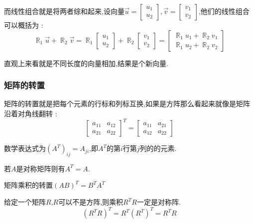 \documentclass[UTF8,12pt]{ctexbook}
\newcommand{\transpose}{^T}
\DeclareMathOperator{\mathRealNumberCollection}{\mathbb{R}}
\begin{document}
{{{{{    而线性组合就是将两者综和起来,设向量$\vec{u} = \begin{bmatrix}
        u_1 \\
        u_2
      \end{bmatrix},\vec{v} = \begin{bmatrix}
        v_1 \\
        v_2
      \end{bmatrix}$,他们的线性组合可以概括为 : $$
      \mathRealNumberCollection_1\vec{u} + \mathRealNumberCollection_2\vec{v} = \mathRealNumberCollection_1\begin{bmatrix}
        u_1 \\
        u_2
      \end{bmatrix}
      +
      \mathRealNumberCollection_2\begin{bmatrix}
        v_1 \\
        v_2
      \end{bmatrix}
      =
      \begin{bmatrix}
        \mathRealNumberCollection_1 u_1 + \mathRealNumberCollection_2 v_1 \\
        \mathRealNumberCollection_1 u_2 + \mathRealNumberCollection_2 v_2
      \end{bmatrix}
    $$

    直观上来看就是不同长度的向量相加,结果是个新向量.
  }%

  \subsubsection{矩阵的转置}{
    矩阵的转置就是把每个元素的行标和列标互换,如果是方阵那么看起来就像是矩阵沿着对角线翻转 :
    $$
      \begin{bmatrix}
        a_{11} & a_{12} \\
        a_{21} & a_{22}
      \end{bmatrix}\transpose
      =
      \begin{bmatrix}
        a_{11} & a_{21} \\
        a_{12} & a_{22}
      \end{bmatrix}
    $$

    数学表达式为$(A\transpose)_{ij} = A_{ji}$,即$A^T$的第$i$行第$j$列的的元素.

    若$A$是对称矩阵则有$A\transpose = A$.

    矩阵乘积的转置$(AB)\transpose = B\transpose A\transpose$

    给定一个矩阵$R$,$R$可以不是方阵,则乘积$R\transpose R$一定是对称阵.
    $$
      (R\transpose R)\transpose = R\transpose(R\transpose)\transpose = R\transpose R
    $$
  }%

}}}}
\end{document}
